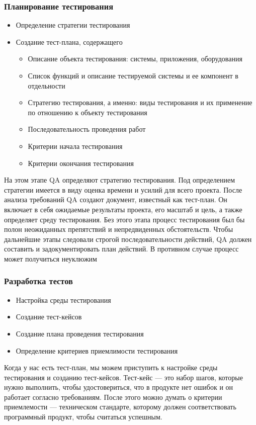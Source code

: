 \documentclass{../industrial-development}
\begin{document}
	\begin{frame} \frametitle{Планирование тестирования}
		\begin{itemize}
			\item Определение стратегии тестирования
			\item Создание тест-плана, содержащего
				\begin{itemize}
					\item Описание объекта тестирования: системы, приложения, оборудования
					\item Список функций и описание тестируемой системы и ее компонент в отдельности
					\item Стратегию тестирования, а именно: виды тестирования и их применение по отношению к объекту тестирования
					\item Последовательность проведения работ
					\item Критерии начала тестирования
					\item Критерии окончания тестирования
				\end{itemize}			
		\end{itemize}
			
	\end{frame}
	\lecturenotes На этом этапе QA определяют стратегию тестирования. Под определением стратегии имеется в виду оценка времени и усилий для всего проекта. После анализа требований QA создают документ, известный как тест-план. Он включает в себя ожидаемые результаты проекта, его масштаб и цель, а также определяет среду тестирования.
	Без этого этапа процесс тестирования был бы полон неожиданных препятствий и непредвиденных обстоятельств. Чтобы дальнейшие этапы следовали строгой последовательности действий, QA должен составить и задокументировать план действий. В противном случае процесс может получиться неуклюжим
	
	\begin{frame} \frametitle{Разработка тестов}
		\begin{itemize}
			\item Настройка среды тестирования
			\item Создание тест-кейсов
			\item Создание плана проведения тестирования
			\item Определение критериев приемлимости тестирования
		\end{itemize}
	\end{frame}
	\lecturenotes Когда у нас есть тест-план, мы можем приступить к настройке среды тестирования и созданию тест-кейсов. Тест-кейс --- это набор шагов, которые нужно выполнить, чтобы удостовериться, что в продукте нет ошибок и он работает согласно требованиям. После этого можно думать о критерии приемлемости — техническом стандарте, которому должен соответствовать программный продукт, чтобы считаться успешным.
	
\end{document}
